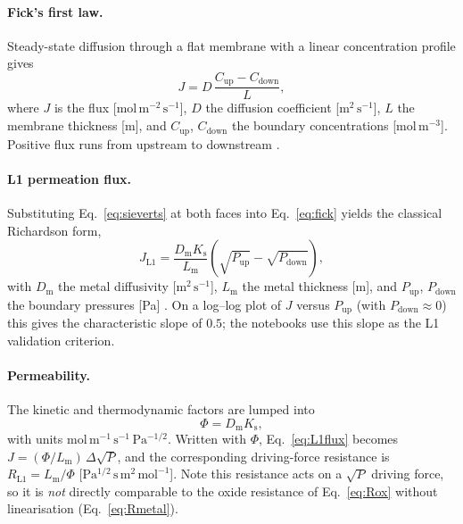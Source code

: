 \documentclass[11pt,a4paper]{article}
\newcommand{\Pup}{P_{\mathrm{up}}}
\newcommand{\Pdown}{P_{\mathrm{down}}}
\newcommand{\Ks}{K_{\mathrm{s}}}
\newcommand{\Dm}{D_{\mathrm{m}}}
\newcommand{\Lm}{L_{\mathrm{m}}}
\begin{document}
\paragraph{Fick's first law.} Steady-state diffusion through a flat membrane
with a linear concentration profile gives
\begin{equation}
  J = D\,\frac{C_{\mathrm{up}} - C_{\mathrm{down}}}{L},
  \label{eq:fick}
\end{equation}
where $J$ is the flux [$\mathrm{mol\,m^{-2}\,s^{-1}}$], $D$ the diffusion
coefficient [$\mathrm{m^2\,s^{-1}}$], $L$ the membrane thickness [m], and
$C_{\mathrm{up}}$, $C_{\mathrm{down}}$ the boundary concentrations
[$\mathrm{mol\,m^{-3}}$]. Positive flux runs from upstream to downstream
\citep{fick1855}.

\paragraph{L1 permeation flux.} Substituting Eq.~\eqref{eq:sieverts} at both
faces into Eq.~\eqref{eq:fick} yields the classical Richardson form,
\begin{equation}
  J_{\mathrm{L1}} = \frac{\Dm \Ks}{\Lm}\left(\sqrt{\Pup} - \sqrt{\Pdown}\right),
  \label{eq:L1flux}
\end{equation}
with $\Dm$ the metal diffusivity [$\mathrm{m^2\,s^{-1}}$], $\Lm$ the metal
thickness [m], and $\Pup$, $\Pdown$ the boundary pressures [Pa]
\citep{richardson1904,sieverts1929}. On a log--log
plot of $J$ versus $\Pup$ (with $\Pdown \approx 0$) this gives the
characteristic slope of $0.5$; the notebooks use this slope as the L1
validation criterion.

\paragraph{Permeability.} The kinetic and thermodynamic factors are lumped into
\begin{equation}
  \Phi = \Dm \Ks,
  \label{eq:permeability}
\end{equation}
with units $\mathrm{mol\,m^{-1}\,s^{-1}\,Pa^{-1/2}}$. Written with $\Phi$,
Eq.~\eqref{eq:L1flux} becomes $J = (\Phi/\Lm)\,\Delta\sqrt{P}$, and the
corresponding driving-force resistance is $R_{\mathrm{L1}} = \Lm/\Phi$
[$\mathrm{Pa^{1/2}\,s\,m^{2}\,mol^{-1}}$]. Note this resistance acts on a
$\sqrt{P}$ driving force, so it is \emph{not} directly comparable to the
oxide resistance of Eq.~\eqref{eq:Rox} without linearisation
(Eq.~\eqref{eq:Rmetal}).
\end{document}
